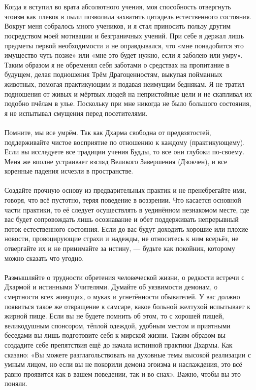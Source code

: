 \\ \\ Когда я вступил во врата абсолютного учения, моя способность отвергнуть эгоизм как плевок в пыли позволила захватить цитадель естественного состояния. Вокруг меня собралось много учеников, и я стал приносить пользу другим посредством моей мотивации и безграничных учений. При себе я держал лишь предметы первой необходимости и не оправдывался, что «мне понадобится это имущество чуть позже» или «мне это будет нужно, если я заболею или умру». Таким образом я не обременял себя заботами о средствах на пропитание в будущем, делая подношения Трём Драгоценностям, выкупая пойманных животных, помогая практикующим и подавая неимущим беднякам. Я не тратил подношения от живых и мёртвых людей на непристойные цели и не скапливал их подобно пчёлам в улье. Поскольку при мне никогда не было большого состояния, я не испытывал смущения перед посетителями.
\\ \\ Помните, мы все умрём. Так как Дхарма свободна от предвзятостей, поддерживайте чистое восприятие по отношению к каждому (практикующему). Если вы исследуете все традиции учения Будды, то все они глубоки по-своему. Меня же вполне устраивает взгляд Великого Завершения (Дзокчен), и все коренные падения исчезли в пространстве.
\\ \\ Создайте прочную основу из предварительных практик и не пренебрегайте ими, говоря, что всё пустотно, теряя поведение в воззрении. Что касается основной части практики, то её следует осуществлять в уединённом незнакомом месте, где вас будет сопровождать лишь осознавание и обет поддерживать непрерывный поток естественного состояния. Если до вас будут доходить хорошие или плохие новости, провоцирующие страхи и надежды, не относитесь к ним всерьёз, не отвергайте их и не принимайте за истину, — будьте как покойник, которому можно сказать что угодно.
\\ \\ Размышляйте о трудности обретения человеческой жизни, о редкости встречи с Дхармой и истинными Учителями. Думайте об уязвимости демонам, о смертности всех живущих, о муках и угнетённости обывателей. У вас должно появиться такое же отвращение к самсаре, какое больной желтухой испытывает к жирной пище. Если вы не будете помнить об этом, то с хорошей пищей, великодушным спонсором, тёплой одеждой, удобным местом и приятными беседами вы лишь подготовите себя к мирской жизни. Таким образом вы создадите себе препятствия ещё до начала истинной практики Дхармы. Как сказано: «Вы можете разглагольствовать на духовные темы высокой реализации с умным лицом, но если вы не покорили демона эгоизма и наслаждения, это всё равно проявится как в вашем поведении, так и во снах». Важно, чтобы вы это поняли.
